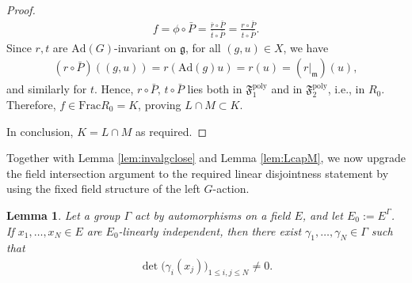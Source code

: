 \documentclass[11pt]{amsart}
\newtheorem{lemma}[theorem]{Lemma}
\theoremstyle{definition}
\theoremstyle{plain}
\theoremstyle{conclusion}
\begin{document}
\begin{proof}
\begin{align*}
f=\phi\circ\bar{P}=\frac{\overline r\circ\bar{P}}{\overline{t}\circ\bar{P}} =\frac{r\circ\bar{P}}{t\circ\bar{P}}.
\end{align*} Since $r,t$ are $\mathrm{Ad}(G)$-invariant on $\mathfrak{g}$, for all $(g,u)\in X$, we have \begin{align*}
(r\circ\bar{P})((g,u))=r(\mathrm{Ad}(g)u)=r(u)=(r\vert_{\mathfrak{m}})(u),
\end{align*} and similarly for $t$. Hence, $r\circ\bar{P},\,t\circ\bar{P}$ lies both in $\mathfrak{F}_1^{\mathrm{poly}}$ and in $\mathfrak{F}_2^{\mathrm{poly}}$, i.e., in $R_0$. Therefore, $f\in \mathrm{Frac} R_0=K$, proving $L\cap M\subset K$.

In conclusion, $K = L \cap M$ as required.
\end{proof}

Together with Lemma \ref{lem:invalgclose} and Lemma \ref{lem:LcapM}, we now upgrade the field intersection argument to the required linear disjointness statement by using the fixed field structure of the left $G$-action. 


\begin{lemma}\cite[Ch. VIII,  Section 3]{LangAlgebra}
\label{lem:artinindependence}
Let a group $\Gamma$ act by automorphisms on a field $E$, and let $E_0:=E^\Gamma$. If $x_1,\ldots,x_N\in E$ are $E_0$-linearly independent, then there exist $\gamma_1,\ldots,\gamma_N\in\Gamma$ such that
\begin{align*} \det\big(\gamma_i(x_j)\big)_{1\leq i,j\leq N}\neq 0 . \end{align*}
\end{lemma}
\end{document}
